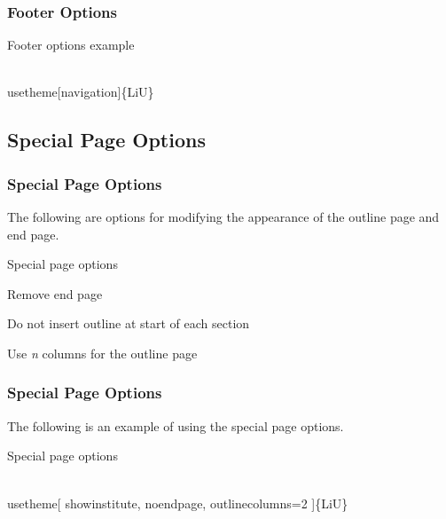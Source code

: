 \documentclass[noamsthm, english]{beamer}%
\newenvironment{codeblock}[1][Example Code]
    {\begin{block}{#1}\footnotesize\vspace{-1em}\begin{semiverbatim}}%
    {\end{semiverbatim}\vspace{-1em}\end{block}}%
\begin{document}
\begin{frame}[fragile]
\frametitle{Footer Options}
\begin{codeblock}[Footer options example]
\\usetheme[navigation]\{LiU\}
\end{codeblock}
\end{frame}

\subsection{Special Page Options}

\begin{frame}
\frametitle{Special Page Options}
The following are options for modifying the appearance of the outline page and end page.
\begin{block}{Special page options}
\centering \footnotesize
\begin{description}[noheadernumber]
\item[noendpage] Remove end page
\item[nooutline] Do not insert outline at start of each section
\item[outlinecolumns={\it n}] Use {\it n} columns for the outline page
\end{description}
\end{block}
\end{frame}

\begin{frame}[fragile]
\frametitle{Special Page Options}
The following is an example of using the special page options.
\begin{codeblock}[Special page options]
\\usetheme[%
\hspace{1em}showinstitute,%
\hspace{1em}noendpage,%
\hspace{1em}outlinecolumns=2%
]\{LiU\}
\end{codeblock}
\end{frame}
\end{document}
